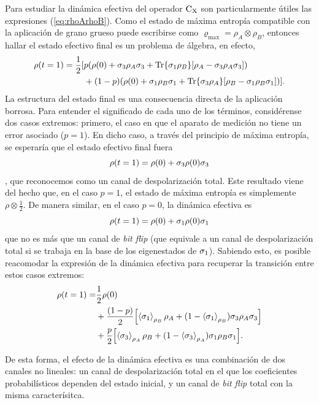 Para estudiar la dinámica efectiva del operador $\text{C}_{\text{X}}$ son particularmente útiles las expresiones (\ref{eq:rhoArhoB}). Como el estado de máxima entropía compatible con la aplicación de grano grueso puede escribirse como $\varrho_{\max}=\rho_{A}\otimes\rho_{B}$, entonces hallar el estado efectivo final es un problema de álgebra, en efecto,
\begin{align*}
    \rho(t=1)=\frac{1}{2}[&p(\rho(0)+\sigma_{3}\rho_{A}\sigma_{3}+\Tr{\sigma_{1}\rho_{B}}[\rho_{A}-\sigma_{3}\rho_{A}\sigma_{3}])\\
    &+(1-p)(\rho(0)+\sigma_{1}\rho_{B}\sigma_{1}+\Tr{\sigma_{3}\rho_{A}}[\rho_{B}-\sigma_{1}\rho_{B}\sigma_{1}])].
\end{align*}
La estructura del estado final es una consecuencia directa de la aplicación borrosa. Para entender el significado de cada uno de los términos, considérense dos casos extremos: primero, el caso en que el aparato de medición no tiene un error asociado ($p=1$). En dicho caso, a través del principio de máxima entropía, se esperaría que el estado efectivo final fuera
\begin{equation*}
  \rho(t=1)=\rho(0)+\sigma_{3}\rho(0)\sigma_{3}
\end{equation*},
que reconocemos como un canal de despolarización total. Este resultado viene del hecho que, en el caso $p=1$, el estado de máxima entropía es simplemente $\rho\otimes\frac{1}{2}$. De manera similar, en el caso $p=0$, la dinámica efectiva es
\begin{equation*}
  \rho(t=1)=\rho(0)+\sigma_{1}\rho(0)\sigma_{1}
\end{equation*}
que no es más que un canal de \textit{bit flip} (que equivale a un canal de despolarización total si se trabaja en la base de los eigenestados de $\sigma_{1}$). Sabiendo esto, es posible reacomodar la expresión de la dinámica efectiva para recuperar la transición entre estos casos extremos:
\begin{align*}
  \rho(t=1)=&\frac{1}{2}\rho(0)\\
  &+\frac{(1-p)}{2}\qty[\expval{\sigma_{1}}_{\rho_{B}}\rho_{A}+(1-\expval{\sigma_{1}}_{\rho_{B}})\sigma_{3}\rho_{A}\sigma_{3}]\\
  &+\frac{p}{2}\qty[\expval{\sigma_{3}}_{\rho_{A}}\rho_{B}+(1-\expval{\sigma_{3}}_{\rho_{A}})\sigma_{1}\rho_{B}\sigma_{1}].
\end{align*}

De esta forma, el efecto de la dinámica efectiva es una combinación de dos canales no lineales: un canal de despolarización total en el que los coeficientes probabilísticos dependen del estado inicial, y un canal de \textit{bit flip} total con la misma caracterísitca. 





